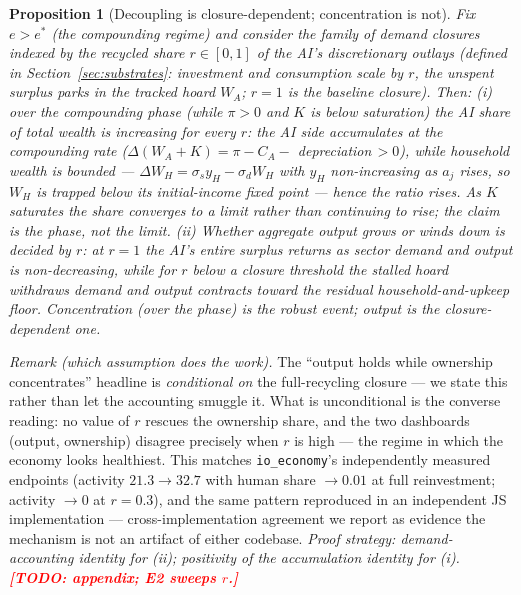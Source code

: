 \documentclass[11pt]{article}
\newtheorem{proposition}{Proposition}
\newcommand{\TODO}[1]{\textcolor{red}{\textbf{[TODO: #1]}}}
\begin{document}
\begin{proposition}[Decoupling is closure-dependent; concentration is
not]\label{prop:decouple}
Fix $e > e^{*}$ (the compounding regime) and consider the family of demand
closures indexed by the recycled share
$r \in [0,1]$ of the AI's discretionary outlays (defined in
Section~\ref{sec:substrates}: investment and consumption scale by $r$, the
unspent surplus parks in the tracked hoard $W_A$; $r=1$ is the baseline
closure). Then: (i) \emph{over the compounding phase} (while $\pi > 0$ and
$K$ is below saturation) the AI share of total wealth is increasing for
every $r$: the AI side accumulates at the compounding rate
($\Delta(W_A + K) = \pi - C_A - $ depreciation$\,> 0$), while household
wealth is bounded --- $\Delta W_H = \sigma_s y_H - \sigma_d W_H$ with
$y_H$ non-increasing as $a_j$ rises, so $W_H$ is trapped below its
initial-income fixed point --- hence the ratio rises. As $K$ saturates the
share converges to a limit rather than continuing to rise; the claim is the
phase, not the limit. (ii) Whether aggregate output grows or winds down is
decided by $r$: at $r = 1$ the AI's entire surplus returns as sector demand
and output is non-decreasing, while for $r$ below a closure threshold the
stalled hoard withdraws demand and output contracts toward the residual
household-and-upkeep floor. Concentration (over the phase) is the robust
event; output is the closure-dependent one.
\end{proposition}
\noindent\emph{Remark (which assumption does the work).} The ``output holds
while ownership concentrates'' headline is \emph{conditional on} the
full-recycling closure --- we state this rather than let the accounting
smuggle it. What is unconditional is the converse reading: no value of $r$
rescues the ownership share, and the two dashboards (output, ownership)
disagree precisely when $r$ is high --- the regime in which the economy
looks healthiest. This matches \texttt{io\_economy}'s independently measured
endpoints (activity $21.3 \to 32.7$ with human share $\to 0.01$ at full
reinvestment; activity $\to 0$ at $r=0.3$), and the same pattern reproduced
in an independent JS implementation --- cross-implementation agreement we
report as evidence the mechanism is not an artifact of either codebase.
\emph{Proof strategy: demand-accounting identity for (ii); positivity of the
accumulation identity for (i). \TODO{appendix; E2 sweeps $r$.}}
\end{document}
